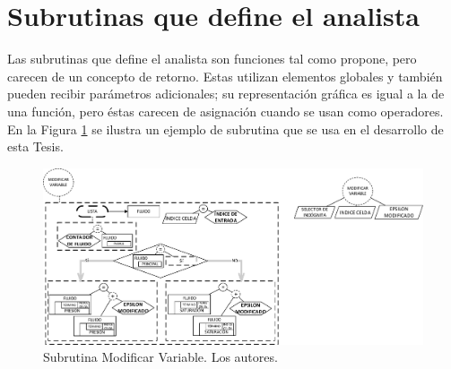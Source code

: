 
\section{Subrutinas que define el analista}\label{sec:PS_ADS}
Las subrutinas que define el analista son funciones tal como \cite{JCalle} propone, pero carecen de un concepto de retorno. Estas utilizan elementos globales y también pueden recibir parámetros adicionales; su representación gráfica es igual a la de una función, pero éstas carecen de asignación cuando se usan como operadores. En la Figura \ref{fig:Subroutine} se ilustra un ejemplo de subrutina que se usa en el desarrollo de esta Tesis. %

\begin{figure}[h]
	\centering%
	\includegraphics[scale=0.6]{Fig/SubrutinaEjemplo.pdf}%
	\caption[Subrutina Modificar Variable.]{Subrutina Modificar Variable. Los autores.} \label{fig:Subroutine}
\end{figure}

